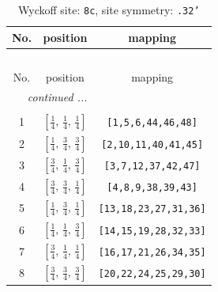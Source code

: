 \documentclass[fleqn,8pt]{jsarticle}
\begin{document}
\renewcommand{\arraystretch}{1.2}
\begin{longtable}{ccc}
\caption{Wyckoff site: {\tt 8c}, site symmetry: {\tt .32'}}
 \\
 \hline \hline
No. & position & mapping \\ \hline \endfirsthead

\multicolumn{2}{l}{\tablename\ \thetable{}} \\
 \hline \hline
No. & position & mapping \\ \hline \endhead

 \hline \hline
\multicolumn{2}{r}{\footnotesize\it continued ...} \\ \endfoot

 \hline \hline
\multicolumn{2}{r}{} \\ \endlastfoot

1 & $\left[ \frac{1}{4},\, \frac{1}{4},\, \frac{1}{4} \right]$ & {\tt [1,5,6,44,46,48]} \\ \hline
2 & $\left[ \frac{1}{4},\, \frac{3}{4},\, \frac{3}{4} \right]$ & {\tt [2,10,11,40,41,45]} \\ \hline
3 & $\left[ \frac{3}{4},\, \frac{1}{4},\, \frac{3}{4} \right]$ & {\tt [3,7,12,37,42,47]} \\ \hline
4 & $\left[ \frac{3}{4},\, \frac{3}{4},\, \frac{1}{4} \right]$ & {\tt [4,8,9,38,39,43]} \\ \hline
5 & $\left[ \frac{1}{4},\, \frac{3}{4},\, \frac{1}{4} \right]$ & {\tt [13,18,23,27,31,36]} \\ \hline
6 & $\left[ \frac{1}{4},\, \frac{1}{4},\, \frac{3}{4} \right]$ & {\tt [14,15,19,28,32,33]} \\ \hline
7 & $\left[ \frac{3}{4},\, \frac{1}{4},\, \frac{1}{4} \right]$ & {\tt [16,17,21,26,34,35]} \\ \hline
8 & $\left[ \frac{3}{4},\, \frac{3}{4},\, \frac{3}{4} \right]$ & {\tt [20,22,24,25,29,30]} \\
\end{longtable}
\renewcommand{\arraystretch}{1.2}
\end{document}
